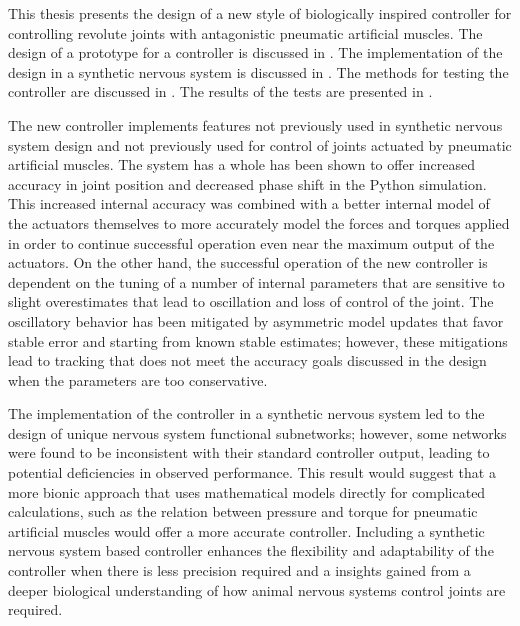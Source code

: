 
This thesis presents the design of a new style of biologically inspired
controller for controlling revolute joints with antagonistic pneumatic
artificial muscles. The
design of a prototype for a controller is discussed in
. The implementation of the design in a
synthetic nervous system is discussed in . The methods
for testing the controller are discussed in . The results of
the tests are presented in .

The new controller implements features not previously used in synthetic nervous
system design and not previously used for control of joints actuated by
pneumatic artificial muscles. The system has a whole has been shown to offer
increased accuracy in joint position and decreased phase shift in the Python simulation. This increased internal accuracy was
combined with a better internal model of the actuators themselves to more
accurately model the forces and torques applied in order to continue successful
operation even near the maximum output of the actuators. On the other hand, the
successful operation of the new controller is dependent on the tuning of a number of
internal parameters that are sensitive to slight overestimates that lead to
oscillation and loss of control of the joint. The oscillatory behavior has been mitigated by
asymmetric model updates that favor stable error and starting from known stable
estimates; however, these mitigations lead to tracking that does not meet the accuracy goals
discussed in the design when the parameters are too conservative.

The implementation of the controller in a synthetic nervous system led to the
design of unique nervous system functional subnetworks; however, some networks
were found to be inconsistent with their standard controller output, leading to
potential deficiencies in observed performance. This result would suggest that a more
bionic approach that uses mathematical models directly for complicated
calculations, such as the relation between pressure and torque for pneumatic
artificial muscles would offer a more accurate controller. Including a synthetic nervous system based controller enhances the flexibility and adaptability of the controller when there is less precision required and a insights gained from a deeper biological understanding of how animal nervous systems control joints are required.


